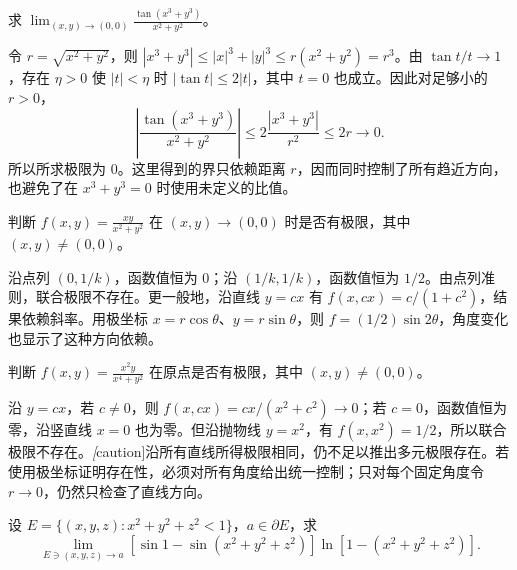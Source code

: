 \documentclass[UTF8,12pt,a4paper,fontset=fandol]{ctexbook}
\begin{document}
\begin{example}
\label{ex:multivariable-tangent-cubic-limit}
求 $\displaystyle\lim_{(x,y)\to(0,0)}\frac{\tan(x^3+y^3)}{x^2+y^2}$。
\end{example}

\begin{solve}
令 $r=\sqrt{x^2+y^2}$，则 $|x^3+y^3|\leq|x|^3+|y|^3\leq r(x^2+y^2)=r^3$。由 $\tan t/t\to1$，存在 $\eta>0$ 使 $|t|<\eta$ 时 $|\tan t|\leq2|t|$，其中 $t=0$ 也成立。因此对足够小的 $r>0$，
\[
    \left|\frac{\tan(x^3+y^3)}{x^2+y^2}\right|
       \leq2\frac{|x^3+y^3|}{r^2}\leq2r\to0.
\]
所以所求极限为 $0$。这里得到的界只依赖距离 $r$，因而同时控制了所有趋近方向，也避免了在 $x^3+y^3=0$ 时使用未定义的比值。
\end{solve}

\begin{example}
\label{ex:multivariable-xy-direction-dependent-limit}
判断 $\displaystyle f(x,y)=\frac{xy}{x^2+y^2}$ 在 $(x,y)\to(0,0)$ 时是否有极限，其中 $(x,y)\neq(0,0)$。
\end{example}

\begin{solve}
沿点列 $(0,1/k)$，函数值恒为 $0$；沿 $(1/k,1/k)$，函数值恒为 $1/2$。由点列准则，联合极限不存在。更一般地，沿直线 $y=cx$ 有 $f(x,cx)=c/(1+c^2)$，结果依赖斜率。用极坐标 $x=r\cos\theta$、$y=r\sin\theta$，则 $f=(1/2)\sin2\theta$，角度变化也显示了这种方向依赖。
\end{solve}

\begin{example}
\label{ex:all-line-limits-insufficient}
判断 $\displaystyle f(x,y)=\frac{x^2y}{x^4+y^2}$ 在原点是否有极限，其中 $(x,y)\neq(0,0)$。
\end{example}

\begin{solve}
沿 $y=cx$，若 $c\neq0$，则 $f(x,cx)=cx/(x^2+c^2)\to0$；若 $c=0$，函数值恒为零，沿竖直线 $x=0$ 也为零。但沿抛物线 $y=x^2$，有 $f(x,x^2)=1/2$，所以联合极限不存在。\emph[caution]{沿所有直线所得极限相同，仍不足以推出多元极限存在。}若使用极坐标证明存在性，必须对所有角度给出统一控制；只对每个固定角度令 $r\to0$，仍然只检查了直线方向。
\end{solve}

\begin{example}
\label{ex:ball-boundary-radial-logarithm-limit}
设 $E=\{(x,y,z):x^2+y^2+z^2<1\}$，$a\in\partial E$，求
\[
    \lim_{E\ni(x,y,z)\to a}
    [\sin1-\sin(x^2+y^2+z^2)]\ln[1-(x^2+y^2+z^2)].
\]
\end{example}
\end{document}
